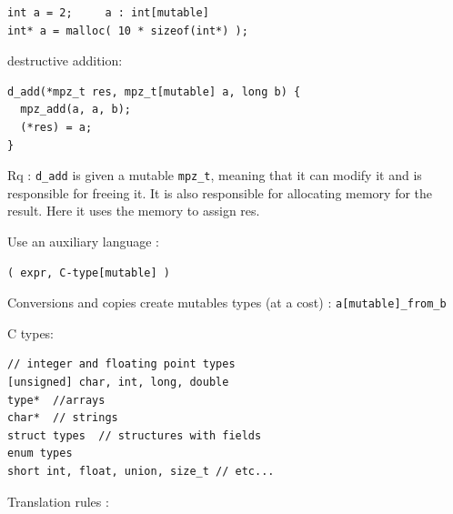 \documentclass[12pt,a4paper,titlepage]{article}
\newcommand{\cl}[1]{\texttt{#1}}
\newcommand{\mpzt}{\texttt{mpz\_t}}
\begin{document}
\begin{lstlisting}
int a = 2;     a : int[mutable]
int* a = malloc( 10 * sizeof(int*) );  
\end{lstlisting}

destructive addition:

\begin{lstlisting}
d_add(*mpz_t res, mpz_t[mutable] a, long b) {
  mpz_add(a, a, b);
  (*res) = a;
}
\end{lstlisting}

Rq : \cl{d\_add} is given a mutable \mpzt, meaning that it can modify it and is responsible for freeing it.
It is also responsible for allocating memory for the result.
Here it uses the memory to assign res.



Use an auxiliary language :

\begin{lstlisting}
( expr, C-type[mutable] )
\end{lstlisting}

Conversions and copies create mutables types (at a cost) :
\cl{a[mutable]\_from\_b}

\cite{fillcomp}







C types:\\
\cite{huss2004c}
\begin{lstlisting}[caption=C types]
// integer and floating point types
[unsigned] char, int, long, double
type*  //arrays
char*  // strings
struct types  // structures with fields
enum types
short int, float, union, size_t // etc...
\end{lstlisting}


Translation rules :
\end{document}

